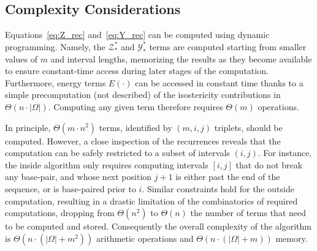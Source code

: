 \subsection{Complexity Considerations}
Equations~\eqref{eq:Z_rec} and~\eqref{eq:Y_rec} can be computed using dynamic programming. Namely, the $\mathcal{Z}^{*}_{*}$ and $\mathcal{Y}^{*}_{*}$ terms are computed starting from smaller values of $m$ and interval lengths, memorizing the results as they become available to ensure constant-time access during later stages of the computation. Furthermore, energy terms $E(\cdot)$ can be accessed in constant time thanks to a simple precomputation (not described)  of the isostericity contributions in $\Theta(n\cdot|\Omega|)$. Computing any given term therefore requires $\Theta(m)$ operations.

In principle, $\Theta(m\cdot n^2)$ terms, identified by $(m,i,j)$ triplets, should be computed.
However, a close inspection of the recurrences reveals that the computation can be safely restricted to a subset of intervals $(i,j)$.
For instance, the inside algorithm only requires computing intervals $[i,j]$ that do not break any base-pair, and whose next position $j+1$ is either past the end of the sequence, or is base-paired prior to $i$. Similar constraints hold for the outside computation, resulting in a drastic limitation of the combinatorics of required computations, dropping from $\Theta(n^2)$ to $\Theta(n)$ the number of terms that need to be computed and stored. Consequently the overall complexity of the algorithm is $\Theta(n\cdot(|\Omega|+m^2))$ arithmetic operations and $\Theta(n\cdot(|\Omega|+m))$ memory.
